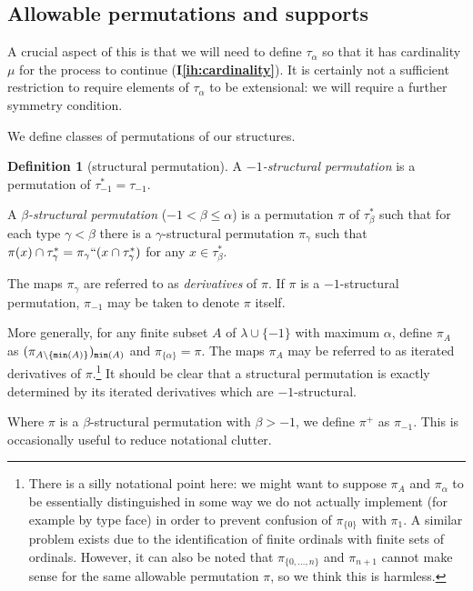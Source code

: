 \documentclass[112pt]{article}
\theoremstyle{definition}
\newtheorem{definition}[theorem]{Definition}
\theoremstyle{remark}
\newcommand{\ihref}[1]{(\textbf{I\ref{#1}})}
\begin{document}
\subsection{Allowable permutations and supports}

A crucial aspect of this is that we will need to define $\tau_\alpha$ so that it has cardinality $\mu$ for the process to continue {\ihref{ih:cardinality}}.  It is certainly not a sufficient restriction to require elements of $\tau_\alpha$ to be extensional:  we will require a further symmetry condition.

We define classes of permutations of our structures.
\begin{definition}[structural permutation]\label{def:structural_permutation}
A {\em $-1$-structural permutation\/} is a permutation of $\tau_{-1}^* = \tau_{-1}$.


A {\em $\beta$-structural permutation\/} ($-1 < \beta \leq \alpha$) is a permutation $\pi$ of $\tau_\beta^*$ such that for each type $\gamma<\beta$ there is a $\gamma$-structural permutation
$\pi_\gamma$ such that $\pi(x) \cap \tau^*_\gamma = \pi_\gamma``(x \cap \tau^*_\gamma)$ for any $x \in \tau^*_\beta$.

The maps $\pi_\gamma$ are referred to as {\em derivatives\/} of $\pi$.  {If $\pi$ is a $-1$-structural permutation, $\pi_{-1}$ may be taken to denote $\pi$ itself.}

More generally, for any finite subset $A$ of $\lambda \cup \{-1\}$ with maximum $\alpha$,
define $\pi_A$ as $(\pi_{A \setminus \{{\tt min}(A)\}})_{{\tt min}(A)}$ {and $\pi_{\{\alpha\}} = \pi$}.  The maps $\pi_A$ may be referred to as iterated derivatives of $\pi$.\footnote{There is a silly notational point here:  we might want to suppose $\pi_A$ and $\pi_\alpha$ to be essentially distinguished in some way we do not actually implement (for example by type face) in order to prevent confusion of $\pi_{\{0\}}$ with $\pi_1$.  A similar problem exists due to the identification of finite ordinals with finite sets of ordinals.  However, it can also be noted that $\pi_{\{0,\ldots,n\}}$ and $\pi_{n+1}$ cannot make sense for the same allowable permutation $\pi$, so we think this is harmless.}  It should be clear that a structural permutation is exactly determined by its iterated derivatives which are $-1$-structural.

Where $\pi$ is a $\beta$-structural permutation with $\beta>-1$, we define $\pi^+$ as $\pi_{-1}$.  This is occasionally useful to reduce notational clutter.
\end{definition}
\end{document}

